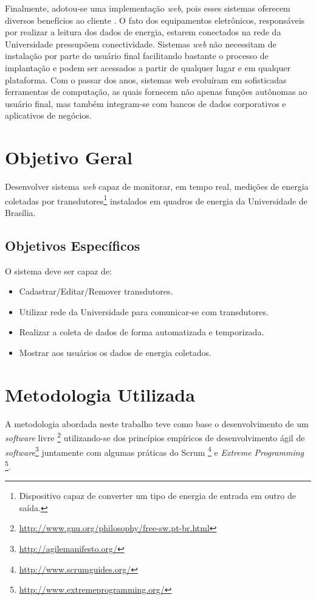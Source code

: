 Finalmente, adotou-se uma implementação \textit{web}, pois esses sistemas oferecem diversos benefícios ao cliente \cite{pressman_2009}. O fato dos equipamentos eletrônicos, responsáveis por realizar a leitura dos dados de energia, estarem conectados na rede da Universidade pressupõem conectividade. Sistemas \textit{web} não necessitam de instalação por parte do usuário final facilitando bastante o processo de implantação e podem ser acessados a partir de qualquer lugar e em qualquer plataforma. Com o passar dos anos, sistemas web evoluíram em sofisticadas ferramentas de computação, as quais fornecem não apenas funções autônomas ao usuário final, mas também integram-se com bancos de dados corporativos e aplicativos de negócios.

\section{Objetivo Geral}
Desenvolver sistema \textit{web} capaz de monitorar, em tempo real, medições de energia coletadas por transdutores\footnote{Dispositivo capaz de converter um tipo de energia de entrada em outro de saída.}
instalados em quadros de energia da Universidade de Brasília.

\subsection{Objetivos Específicos}
O sistema deve ser capaz de:
\begin{itemize}
    \item Cadastrar/Editar/Remover transdutores.
    \item Utilizar rede da Universidade para comunicar-se com transdutores.
    \item Realizar a coleta de dados de forma automatizada e temporizada.
    \item Mostrar aos usuários os dados de energia coletados.
\end{itemize}

\section{Metodologia Utilizada}
A metodologia abordada neste trabalho teve como base o desenvolvimento de um \textit{software} livre \footnote{\url{http://www.gnu.org/philosophy/free-sw.pt-br.html}} utilizando-se dos princípios empíricos de desenvolvimento ágil de \textit{software}\footnote{\url{http://agilemanifesto.org/}} juntamente com algumas práticas do Scrum \footnote{\url{http://www.scrumguides.org/}} e \textit{Extreme Programming} \footnote{\url{http://www.extremeprogramming.org/}}.

